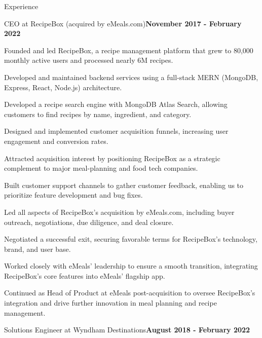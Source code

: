 \documentclass{resume} %
\begin{document}
\begin{rSection}{Experience}
\begin{rSubsection}{CEO at RecipeBox (acquired by eMeals.com)}{\bf November 2017 - February 2022}{}{}
    \item Founded and led RecipeBox, a recipe management platform that grew to 80,000 monthly active users and processed nearly 6M recipes.
    \item Developed and maintained backend services using a full-stack MERN (MongoDB, Express, React, Node.js) architecture.
    \item Developed a recipe search engine with MongoDB Atlas Search, allowing customers to find recipes by name, ingredient, and category.
    \item Designed and implemented customer acquisition funnels, increasing user engagement and conversion rates.    
    \item Attracted acquisition interest by positioning RecipeBox as a strategic complement to major meal-planning and food tech companies.
    \item Built customer support channels to gather customer feedback, enabling us to prioritize feature development and bug fixes.
    \item Led all aspects of RecipeBox’s acquisition by eMeals.com, including buyer outreach, negotiations, due diligence, and deal closure.
    \item Negotiated a successful exit, securing favorable terms for RecipeBox's technology, brand, and user base.
    \item Worked closely with eMeals' leadership to ensure a smooth transition, integrating RecipeBox’s core features into eMeals’ flagship app.
    \item Continued as Head of Product at eMeals post-acquisition to oversee RecipeBox’s integration and drive further innovation in meal planning and recipe management.

    
    \end{rSubsection}


    \begin{rSubsection}{Solutions Engineer at Wyndham Destinations}{\bf August 2018 - February 2022}{}{}


\end{rSubsection}
\end{rSection}
\end{document}
